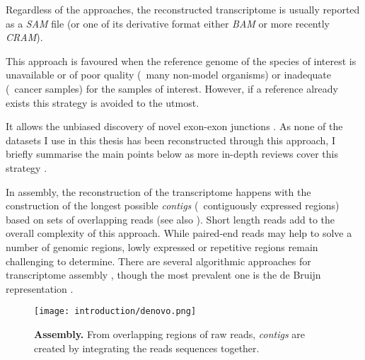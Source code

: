 Regardless of the approaches, the reconstructed transcriptome is usually reported
as a \emph{\gls{SAM}} file  (or one of its derivative format
either \emph{\gls{BAM}} or more recently \emph{CRAM}).

\begin{comment}
\begin{figure}
    \texttt{[image: introduction/MappingStrategies3.pdf]}\centering
    \caption[Overview of main reconstruction strategies for
    \Rnaseq\ transcriptome]{\label{fig:OverviewRnaseqMapping}\textbf{Overview of main
    reconstruction strategies for a \Rnaseq\ transcriptome}}
\end{figure}
\end{comment}

This approach is favoured when the reference genome of the species of interest
is unavailable or of poor quality
(\eg\ many non-model organisms) or inadequate (\eg\ cancer samples)
for the samples of interest. However, if a reference already exists this strategy
is avoided to the utmost.

It allows the unbiased discovery of novel
exon-exon junctions . As none of the datasets I use in this
thesis has been reconstructed through this approach, I briefly summarise
the main points below as more in-depth reviews cover this strategy
.

In  assembly, the reconstruction of the transcriptome happens
with the construction of the longest possible \emph{contigs} (\ie\ contiguously
expressed regions) based on sets of overlapping reads (see also
). Short length reads add
to the overall complexity of this approach. While paired-end reads may help to
solve a number of genomic regions, lowly expressed or repetitive regions remain
challenging to determine. There are several algorithmic approaches for  transcriptome assembly ,
though the most prevalent one is the de Bruijn representation .

\begin{figure}
    \texttt{[image: introduction/denovo.png]}\centering
    \caption[\textit{de novo} Assembly]{\label{fig:denovo}\textbf{
    Assembly.} From overlapping regions of raw reads, \emph{contigs} are
    created by integrating the reads sequences together.}
\end{figure}


